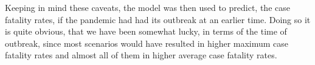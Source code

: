 \documentclass{article}
\begin{document}
Keeping in mind these caveats, the model was then used to predict, the case fatality rates, if the pandemic had had its outbreak at an earlier time. Doing so it is quite obvious, that we have been somewhat lucky, in terms of the time of outbreak, since most scenarios would have resulted in higher maximum case fatality rates and almost all of them in higher average case fatality rates. 




\end{document}
